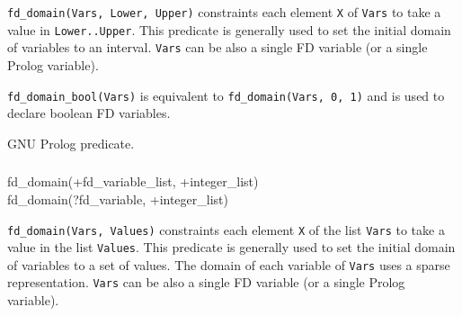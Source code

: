 \Description

\texttt{fd\_domain(Vars, Lower, Upper)} constraints each element \texttt{X}
of \texttt{Vars} to take a value in \texttt{Lower..Upper}. This
predicate is generally used to set the initial domain of variables to an
interval. \texttt{Vars} can be also a single FD variable (or a single Prolog
variable).

\texttt{fd\_domain\_bool(Vars)} is equivalent to \texttt{fd\_domain(Vars, 0,
1)} and is used to declare boolean FD variables.

\begin{PlErrors}








\end{PlErrors}

\Portability

GNU Prolog predicate.

\subsubsection{}

\begin{TemplatesOneCol}
fd\_domain(+fd\_variable\_list, +integer\_list)\\
fd\_domain(?fd\_variable, +integer\_list)

\end{TemplatesOneCol}

\Description

\texttt{fd\_domain(Vars, Values)} constraints each element \texttt{X} of the
list \texttt{Vars} to take a value in the list \texttt{Values}. This
predicate is generally used to set the initial domain of variables to a set
of values. The domain of each variable of \texttt{Vars} uses a sparse
representation. \texttt{Vars} can be also a single FD variable (or a single
Prolog variable).

